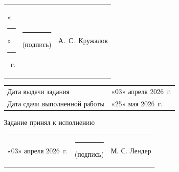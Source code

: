 \documentclass[14pt, a4paper]{extarticle}
\begin{document}
{
\renewcommand{\arraystretch}{2}
\noindent
\begin{tabularx}{\textwidth}{@{} P{0.45\textwidth} P{0.3\textwidth} P{0.25\textwidth} @{}}

    «\rule{0.8cm}{0.4pt}» \quad \rule{2cm}{0.4pt} ~г. &
    \centering \rule{3.5cm}{0.4pt} \par \footnotesize (подпись) &
    \hfill А.~С.~Кружалов                                         \\
\end{tabularx}

\begin{tabularx}{\textwidth}{@{} P{0.45\textwidth} P{0.55\textwidth} @{}}
    Дата выдачи задания           &
    \hfill «03» апреля 2026~г. \\

    Дата сдачи выполненной работы &
    \hfill «25» мая 2026~г. \\
\end{tabularx}
}

Задание принял к исполнению

{
\renewcommand{\arraystretch}{1.5}
\begin{tabularx}{\textwidth}{@{} P{0.45\textwidth} P{0.3\textwidth} P{0.25\textwidth} @{}}

    «03» апреля 2026~г. &
    \centering \rule{3.5cm}{0.4pt} \par \footnotesize (подпись) &
    \hfill М. С. Лендер                                           \\
\end{tabularx}
}
\end{document}
